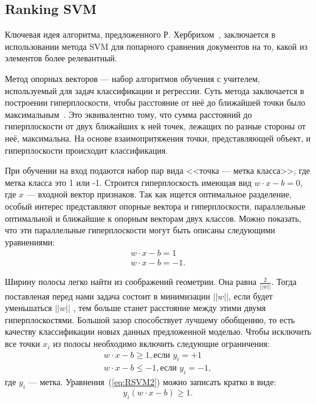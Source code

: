 \subsection{Ranking SVM}

Ключевая идея алгоритма, предложенного Р. Хербрихом~\cite{RankSVM}, заключается в использовании метода SVM для попарного сравнения документов на то, какой из элементов более релевантный. 

Метод опорных векторов --- набор алгоритмов обучения с учителем, используемый для задач классификации и регрессии. Суть метода заключается в построении гиперплоскости, чтобы расстояние от неё до ближайшей точки было максимальным~\cite{ML_no_wors}. Это эквивалентно тому, что сумма расстояний до гиперплоскости от двух ближайших к ней точек, лежащих по разные стороны от неё, максимальна. На основе взаимопритяжения точки, представляющей объект, и гиперплоскости происходит  классификация.

При обучении на вход подаются набор пар вида <<точка --- метка класса>>, где метка класса это 1 или -1. Строится гиперплоскость имеющая вид $w\cdot x - b = 0$, где $x$ ---  входной вектор признаков. Так как ищется оптимальное разделение, особый интерес представляют опорные вектора и гиперплоскости, параллельные оптимальной и ближайшие к опорным векторам двух классов. 
Можно показать, что эти параллельные гиперплоскости могут быть описаны следующими уравнениями:
\begin{equation}
		\label{eq:RSVM1}
	\begin{aligned}
		w \cdot x - b = 1  \\
		w \cdot x - b = - 1 .
	\end{aligned}
\end{equation}

Ширину полосы легко найти из соображений геометрии. Она равна $\frac{2}{||w||}$. Тогда поставленая перед нами задача состоит в минимизации $||w||$, если будет  уменьшаться   $||w||$ , тем больше станет расстояние между этими двумя гиперплоскостями. Большой зазор способствует лучшему обобщению, то есть качеству классификации новых данных предложенной моделью. Чтобы исключить все точки $x_i$ из полосы необходимо включить следующие ограничения:
\begin{equation}
	\label{eq:RSVM2}
	\begin{aligned}
	w \cdot x - b \geq 1, \text{если $y_i = +1$}  \\
	w \cdot x - b \leq -1, \text{если $y_i = -1$} ,
	\end{aligned}
\end{equation}
где $y_i$ --- метка.
Уравнения~(\ref{eq:RSVM2}) можно записать кратко в виде:
\begin{equation}
	\label{eq:RSVM3}
	y_i(w \cdot x - b) \geq 1.
\end{equation}

